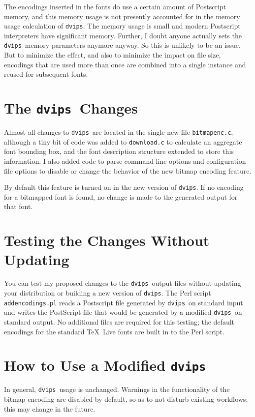 \documentclass{ltugboat}
\def\dvips{\texttt{dvips}}
\begin{document}
The encodings inserted in the fonts do use a certain amount of
Postscript memory, and this memory usage is not presently
accounted for in the memory usage calculation of \dvips.
The memory usage is small and modern Postscript interpreters
have significant memory. Further, I doubt anyone actually sets
the \dvips\ memory parameters anymore anyway.  So this is unlikely
to be an issue.  But to minimize the effect, and also to
minimize the impact on file size, encodings that are used more
than once are combined into a single instance and reused for
subsequent fonts.

\section{The \dvips\ Changes}

Almost all changes to \dvips\ are located in the single new
file \texttt{bitmapenc.c}, although a tiny bit of code was
added to \texttt{download.c} to calculate an aggregate font
bounding box, and the font description structure extended to
store this information.  I also added code to parse command
line options and configuration file options to disable or
change the behavior of the new bitmap encoding feature.

By default this feature is turned on in the new version of
\dvips.  If no encoding for a bitmapped font is found, no
change is made to the generated output for that font.

\section{Testing the Changes Without Updating}

You can test my proposed changes to the \dvips\ output
files without updating your distribution or building a new
version of \dvips.  The Perl script
\texttt{addencodings.pl}\cite{T3S}
reads a Postscript file generated by \dvips\ on
standard input and writes the PostScript file that would be
generated by a modified \dvips\ on standard output.  No
additional files are required for this testing; the default
encodings for the standard \TeX\ Live fonts are built in to
the Perl script.

\section{How to Use a Modified \dvips}

In general, \dvips\ usage is unchanged.  Warnings in
the functionality of the bitmap encoding are disabled by default,
so as to not disturb existing workflows; this may
change in the future.
\end{document}
